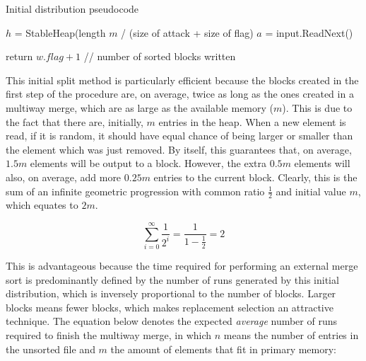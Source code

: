 \documentclass[10pt,a4paper]{article}
\numberwithin{equation}{section}
\begin{document}
\begin{algorithm}[H]
    \caption{Initial distribution pseudocode}


    \BlankLine
    $h$ = StableHeap(length $m$ / (size of attack + size of flag)\;
    $a$ = input.ReadNext()\;

    return $w.flag + 1$ // number of sorted blocks written\;
\end{algorithm}

This initial split method is particularly efficient because the blocks created in the first step of the procedure are, on average, twice as long as the ones created in a multiway merge, which are as large as the available memory ($m$). This is due to the fact that there are, initially, $m$ entries in the heap. When a new element is read, if it is random, it should have equal chance of being larger or smaller than the element which was just removed. By itself, this guarantees that, on average, $1.5m$ elements will be output to a block. However, the extra $0.5m$ elements will also, on average, add more $0.25m$ entries to the current block. Clearly, this is the sum of an infinite geometric progression with common ratio $\frac{1}{2}$ and initial value $m$, which equates to $2m$.

\begin{equation}
    \sum_{i=0}^{\infty} \frac{1}{2^i} = \frac{1}{1 - \frac{1}{2}} = 2
\end{equation}

This is advantageous because the time required for performing an external merge sort is predominantly defined by the number of runs generated by this initial distribution, which is inversely proportional to the number of blocks. Larger blocks means fewer blocks, which makes replacement selection an attractive technique. The equation below denotes the expected \emph{average} number of runs required to finish the multiway merge, in which $n$ means the number of entries in the unsorted file and $m$ the amount of elements that fit in primary memory:
\end{document}
